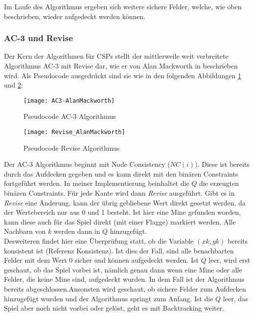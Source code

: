 Im Laufe des Algorithmus ergeben sich weitere sichere Felder, welche, wie oben beschrieben, wieder aufgedeckt werden können.

\subsubsection{AC-3 und Revise}

Der Kern der Algorithmen für CSPs stellt der mittlerweile weit verbreitete Algorithmus AC-3 mit Revise dar, wie er von Alan Mackworth in 
\cite{Alan} beschrieben wird. Als Pseudocode ausgedrückt sind sie wie in den folgenden Abbildungen \ref{AC3} und \ref{Revise}:

\begin{figure}[!htb]
    \centering
    \texttt{[image: AC3-AlanMackworth]}
    \caption{Pseudocode AC-3 Algorithmus}\label{AC3}
\end{figure}
\begin{figure}[!htb]
    \centering
    \texttt{[image: Revise\_AlanMackworth]}
    \caption{Pseudocode Revise Algorithmus}\label{Revise}
\end{figure}

Der AC-3 Algorithmus beginnt mit Node Consistency ($NC(i)$). Diese ist bereits durch das Aufdecken gegeben und es kann direkt mit den
binären Constraints fortgeführt werden. In meiner Implementierung beinhaltet die $Q$ die erzeugten binären Constraints. Für jede Kante wird
dann \textit{Revise} ausgeführt.
Gibt es in \textit{Revise} eine Änderung, kann der übrig gebliebene Wert direkt gesetzt werden, da der 
Wertebereich nur aus 0 und 1 besteht. Ist hier eine Mine gefunden worden, kann diese auch für das Spiel direkt (mit einer Flagge) markiert
werden. Alle Nachbarn von $k$ werden dann in $Q$ hinzugefügt.\\ Desweiteren findet hier eine Überprüfung statt, ob die Variable $(xk, yk)$ bereits
konsistent ist (Referenz Konsistenz). Ist dies der Fall, sind alle benachbarten Felder mit dem Wert 0 sicher und können aufgedeckt werden.
Ist $Q$ leer, wird erst geschaut, ob das Spiel vorbei ist, nämlich genau dann wenn eine Mine oder alle Felder, die keine Mine sind, aufgedeckt
wurden. In dem Fall ist der Algorithmus bereits abgeschlossen.\clearpage Ansonsten wird geschaut, ob sichere Felder zum Aufdecken hinzugefügt wurden
und der Algorithmus springt zum Anfang. Ist die $Q$ leer, das Spiel aber noch nicht vorbei oder gelöst, geht es mit Backtracking weiter.

